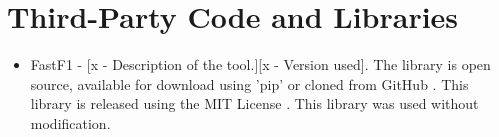 \chapter{Third-Party Code and Libraries}

\begin{itemize}
    \item FastF1 - [x - Description of the tool.][x - Version used]. The library is open source, available for download using 'pip' or cloned from GitHub \cite{software_fastf1}. This library is released using the MIT License \cite{license_mit}. This library was used without modification.
\end{itemize}